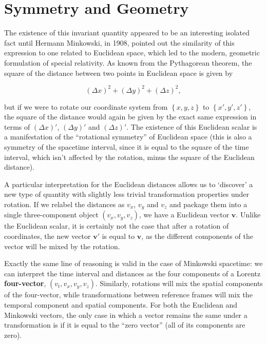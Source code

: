 \documentclass[12pt]{article}
\begin{document}
\section{Symmetry and Geometry}

The existence of this invariant quantity appeared to be an interesting isolated fact until Hermann Minkowski, in 1908, pointed out the similarity of this expression to one related to Euclidean space, which led to the modern, geometric formulation of special relativity. As known from the Pythagorean theorem, the square of the distance between two points in Euclidean space is given by

\begin{equation}
    {\left(\Delta x\right)}^2 + {\left(\Delta y\right)}^2 + {\left(\Delta z\right)}^2,
\end{equation}

but if we were to rotate our coordinate system from $\left\{x, y, z\right\}$ to $\left\{x', y', z'\right\}$, the square of the distance would again be given by the exact same expression in terms of ${\left(\Delta x\right)}'$, ${\left(\Delta y\right)}'$ and ${\left(\Delta z\right)}'$. The existence of this Euclidean scalar is a manifestation of the ``rotational symmetry'' of Euclidean space (this is also a symmetry of the spacetime interval, since it is equal to the square of the time interval, which isn't affected by the rotation, minus the square of the Euclidean distance).
\newline

A particular interpretation for the Euclidean distances allows us to `discover' a new type of quantity with slightly less trivial transformation properties under rotation. If we relabel the distances as $v_x$, $v_y$ and $v_z$ and package them into a single three-component object $\left(v_x, v_y, v_z\right)$, we have a Euclidean vector $\mathbf{v}$. Unlike the Euclidean scalar, it is certainly not the case that after a rotation of coordinates, the new vector $\mathbf{v}'$ is equal to $\mathbf{v}$, as the different components of the vector will be mixed by the rotation.
\newline

Exactly the same line of reasoning is valid in the case of Minkowski spacetime: we can interpret the time interval and distances as the four components of a Lorentz \textbf{four-vector}, $\left(v_t, v_x, v_y, v_z\right)$. Similarly, rotations will mix the spatial components of the four-vector, while transformations between reference frames will mix the temporal component and spatial components. For both the Euclidean and Minkowski vectors, the only case in which a vector remains the same under a transformation is if it is equal to the ``zero vector'' (all of its components are zero).
\newline
\end{document}

